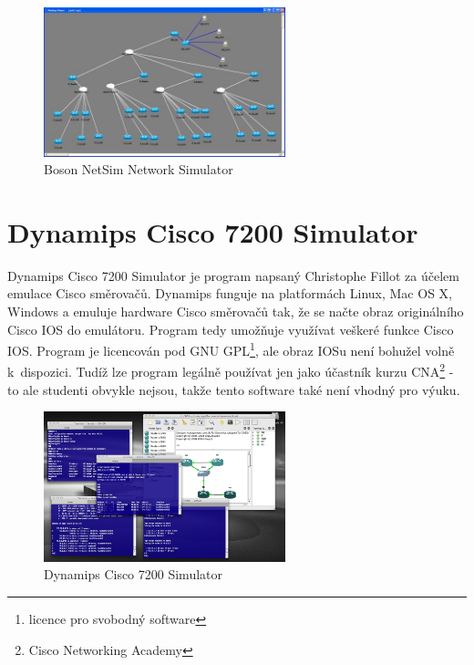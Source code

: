 \begin{figure}[h]
\begin{center}
\includegraphics[width=7cm]{figures/r_boson}
\caption{Boson NetSim Network Simulator}
\label{fig:r_boson}
\end{center}
\end{figure}

\section{Dynamips Cisco 7200 Simulator}
Dynamips Cisco 7200 Simulator \cite{reserse:dynamips} je program napsaný Christophe Fillot za účelem emulace Cisco směrovačů. Dynamips funguje na platformách Linux, Mac OS X, Windows a emuluje hardware Cisco směrovačů tak, že se načte obraz originálního Cisco IOS do emulátoru. Program tedy umožňuje využívat veškeré funkce Cisco IOS. Program je licencován pod GNU GPL\footnote{licence pro svobodný software}, ale obraz IOSu není bohužel volně k~dispozici. Tudíž lze program legálně používat jen jako účastník kurzu CNA\footnote{Cisco Networking Academy} - to ale studenti obvykle nejsou, takže tento software také není vhodný pro výuku.

\begin{figure}[h]
\begin{center}
\includegraphics[width=7cm]{figures/r_dynamips}
\caption{Dynamips Cisco 7200 Simulator}
\label{fig:r_dynamips}
\end{center}
\end{figure}

\newpage


